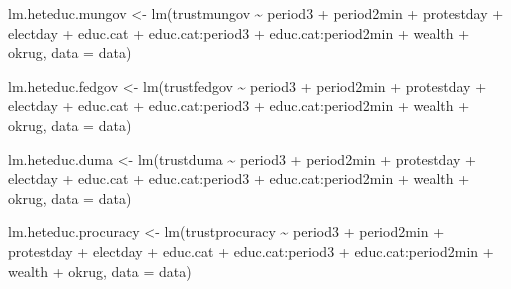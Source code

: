 \documentclass[
  letterpaper,
  DIV=11,
  numbers=noendperiod]{scrartcl}
\newenvironment{Shaded}{\begin{snugshade}}{\end{snugshade}}
\newcommand{\AttributeTok}[1]{\textcolor[rgb]{0.40,0.45,0.13}{#1}}
\newcommand{\FunctionTok}[1]{\textcolor[rgb]{0.28,0.35,0.67}{#1}}
\newcommand{\NormalTok}[1]{\textcolor[rgb]{0.00,0.23,0.31}{#1}}
\newcommand{\OtherTok}[1]{\textcolor[rgb]{0.00,0.23,0.31}{#1}}
\newcommand{\SpecialCharTok}[1]{\textcolor[rgb]{0.37,0.37,0.37}{#1}}
\begin{document}
\begin{Shaded}
\begin{Highlighting}[]
\NormalTok{lm.heteduc.mungov }\OtherTok{\textless{}{-}} \FunctionTok{lm}\NormalTok{(trustmungov }\SpecialCharTok{\textasciitilde{}}\NormalTok{ period3 }\SpecialCharTok{+}\NormalTok{ period2min }\SpecialCharTok{+}\NormalTok{ protestday }\SpecialCharTok{+}\NormalTok{ electday }\SpecialCharTok{+}
\NormalTok{                          educ.cat }\SpecialCharTok{+}\NormalTok{ educ.cat}\SpecialCharTok{:}\NormalTok{period3 }\SpecialCharTok{+}\NormalTok{ educ.cat}\SpecialCharTok{:}\NormalTok{period2min }\SpecialCharTok{+}
\NormalTok{                          wealth }\SpecialCharTok{+}\NormalTok{ okrug, }\AttributeTok{data =}\NormalTok{ data)}

\NormalTok{lm.heteduc.fedgov }\OtherTok{\textless{}{-}} \FunctionTok{lm}\NormalTok{(trustfedgov }\SpecialCharTok{\textasciitilde{}}\NormalTok{ period3 }\SpecialCharTok{+}\NormalTok{ period2min }\SpecialCharTok{+}\NormalTok{ protestday }\SpecialCharTok{+}\NormalTok{ electday }\SpecialCharTok{+}
\NormalTok{                          educ.cat }\SpecialCharTok{+}\NormalTok{ educ.cat}\SpecialCharTok{:}\NormalTok{period3 }\SpecialCharTok{+}\NormalTok{ educ.cat}\SpecialCharTok{:}\NormalTok{period2min }\SpecialCharTok{+}
\NormalTok{                          wealth }\SpecialCharTok{+}\NormalTok{ okrug, }\AttributeTok{data =}\NormalTok{ data)}

\NormalTok{lm.heteduc.duma }\OtherTok{\textless{}{-}} \FunctionTok{lm}\NormalTok{(trustduma }\SpecialCharTok{\textasciitilde{}}\NormalTok{ period3 }\SpecialCharTok{+}\NormalTok{ period2min }\SpecialCharTok{+}\NormalTok{ protestday }\SpecialCharTok{+}\NormalTok{ electday }\SpecialCharTok{+}
\NormalTok{                        educ.cat }\SpecialCharTok{+}\NormalTok{ educ.cat}\SpecialCharTok{:}\NormalTok{period3 }\SpecialCharTok{+}\NormalTok{ educ.cat}\SpecialCharTok{:}\NormalTok{period2min }\SpecialCharTok{+}
\NormalTok{                        wealth }\SpecialCharTok{+}\NormalTok{ okrug, }\AttributeTok{data =}\NormalTok{ data)}

\NormalTok{lm.heteduc.procuracy }\OtherTok{\textless{}{-}} \FunctionTok{lm}\NormalTok{(trustprocuracy }\SpecialCharTok{\textasciitilde{}}\NormalTok{ period3 }\SpecialCharTok{+}\NormalTok{ period2min }\SpecialCharTok{+}\NormalTok{ protestday }\SpecialCharTok{+}\NormalTok{ electday }\SpecialCharTok{+}
\NormalTok{                             educ.cat }\SpecialCharTok{+}\NormalTok{ educ.cat}\SpecialCharTok{:}\NormalTok{period3 }\SpecialCharTok{+}\NormalTok{ educ.cat}\SpecialCharTok{:}\NormalTok{period2min }\SpecialCharTok{+}
\NormalTok{                             wealth }\SpecialCharTok{+}\NormalTok{ okrug, }\AttributeTok{data =}\NormalTok{ data)}


\end{Highlighting}
\end{Shaded}
\end{document}

